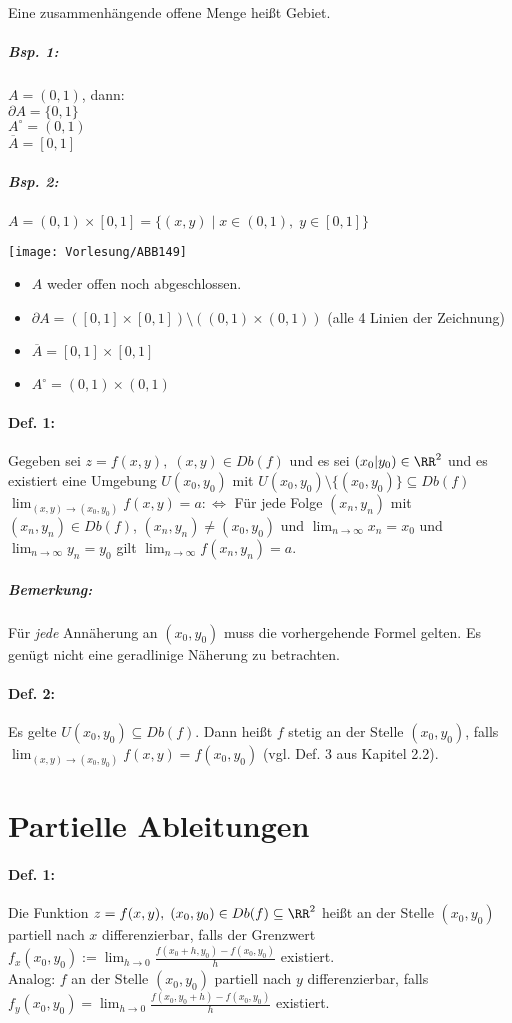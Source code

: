 \begin{itemize}
Eine zusammenhängende offene Menge heißt Gebiet.
\subparagraph{Bsp. 1:} $A=(0,1)$, dann:\\
$\partial A = \{ 0,1\}$\\
$A^\circ = (0,1)$\\
$\overline{A}=[0,1]$
\subparagraph{Bsp. 2:} $A=(0,1) \times [0,1] = \{ (x,y) \mid x\in (0,1), \; y\in [0,1]\}$
\begin{center}
\texttt{[image: Vorlesung/ABB149]}
\end{center}
\begin{itemize}
\item $A$ weder offen noch abgeschlossen.
\item $\partial A=([0,1]\times [0,1])\setminus ((0,1) \times (0,1) )$ (alle 4 Linien der Zeichnung)
\item $\overline{A}=[0,1]\times [0,1]$
\item $A^\circ = (0,1) \times (0,1)$
\end{itemize}
\end{itemize}
\paragraph{Def. 1:} Gegeben sei $z=f(x,y), \; (x,y) \in Db(f)$ und es sei $(x_0|y_0) \in \RR^2$ und es existiert eine Umgebung $U(x_0, y_0)$ mit $U(x_0, y_0) \setminus \{(x_0,y_0)\} \subseteq Db(f)$\\
$\lim_{(x,y) \to (x_0, y_0)} f(x,y) = a : \Leftrightarrow $ Für jede Folge $(x_n, y_n)$ mit $(x_n, y_n) \in Db(f)$, $(x_n, y_n) \not = (x_0, y_0)$ und $\lim_{n\to \infty} x_n =x_0$ und $\lim_{n\to \infty} y_n = y_0$ gilt $\lim_{n\to \infty} f(x_n,y_n) = a$.
\subparagraph{Bemerkung:} Für \emph{jede} Annäherung an $(x_0,y_0)$ muss die vorhergehende Formel gelten. Es genügt nicht eine geradlinige Näherung zu betrachten.
\paragraph{Def. 2:} Es gelte $U(x_0,y_0) \subseteq Db(f)$. Dann heißt $f$ stetig an der Stelle $(x_0,y_0)$, falls \\
$\lim_{(x,y)\to (x_0,y_0)} f(x,y) = f(x_0,y_0)$ (vgl. Def. 3 aus Kapitel 2.2). 

\section{Partielle Ableitungen}
\paragraph{Def. 1:} Die Funktion $z=f(x,y), \; (x_0,y_0) \in Db(f) \subseteq \RR^2$ heißt an der Stelle $(x_0,y_0)$ partiell nach $x$ differenzierbar, falls der Grenzwert \\
$\boxed{f_x(x_0, y_0) := \lim_{h\to 0} \frac{f(x_0+h,y_0) - f(x_0,y_0)}{h}}$ existiert.\\
Analog: $f$ an der Stelle $(x_0,y_0)$ partiell nach $y$ differenzierbar, falls \\
$\boxed{f_y(x_0,y_0)=\lim_{h\to 0} \frac{f(x_0,y_0+h) - f(x_0,y_0)}{h}}$ existiert.

